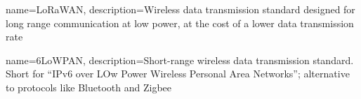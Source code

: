 \makeglossaries

{
  name=LoRaWAN,
  description={Wireless data transmission standard designed for long range communication at low power, at the cost of a lower data transmission rate}
}

{
  name=6LoWPAN,
  description={Short-range wireless data transmission standard. Short for ``IPv6 over LOw Power Wireless Personal Area Networks''; alternative to protocols like Bluetooth and Zigbee}
}